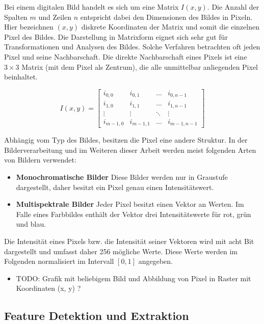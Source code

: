 Bei einem digitalen Bild handelt es sich um eine Matrix $I(x, y)$. Die Anzahl der Spalten $m$ und Zeilen $n$ entspricht dabei den Dimensionen des Bildes in Pixeln. Hier bezeichnen $(x, y)$ diskrete Koordinaten der Matrix und somit die einzelnen Pixel des Bildes. Die Darstellung in Matrixform eignet sich  sehr gut für Transformationen und Analysen des Bildes. Solche Verfahren betrachten oft jeden Pixel und seine Nachbarschaft. Die direkte Nachbarschaft eines Pixels ist eine $3 \times 3$ Matrix (mit dem Pixel als Zentrum), die alle unmittelbar anliegenden Pixel beinhaltet.

$$
I(x, y) = \begin{bmatrix}
i_{0, 0}   & i_{0, 1}	& \dots	 & i_{0, n-1}   \\
i_{1, 0}   & i_{1, 1}   & \dots  & i_{1, n-1}   \\
\vdots	   & \vdots 	& \ddots & \vdots       \\
i_{m-1, 0} & i_{m-1, 1} & \dots	 & i_{m-1, n-1}
\end{bmatrix}
$$ 

Abhängig vom Typ des Bildes, besitzen die Pixel eine andere Struktur. In der Bilderverarbeitung und im Weiteren dieser Arbeit werden meist folgenden Arten von Bildern verwendet:
\begin{itemize}
	\item \textbf{Monochromatische Bilder} Diese Bilder werden nur in Graustufe dargestellt, daher besitzt ein Pixel genau einen Intensitätswert.
	\item \textbf{Multispektrale Bilder} Jeder Pixel besitzt einen Vektor an Werten. Im Falle eines Farbbildes enthält der Vektor drei Intensitätswerte für rot, grün und blau.
\end{itemize}
Die Intensität eines Pixels bzw. die Intensität seiner Vektoren wird mit acht Bit dargestellt und umfasst daher 256 mögliche Werte. Diese Werte werden im Folgenden normalisiert im Intervall $[0, 1]$ angegeben.

\begin{itemize}
	\item TODO: Grafik mit beliebigem Bild und Abbildung von Pixel in Raster mit Koordinaten (x, y) ? 
\end{itemize}

\subsection{Feature Detektion und Extraktion}

